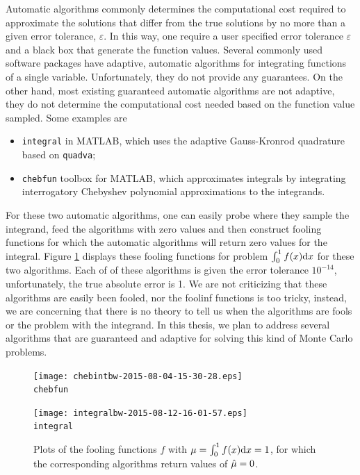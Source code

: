 \documentclass{iitthesis}
\theoremstyle{definition}
\begin{document}

Automatic algorithms commonly determines the computational cost required to approximate the solutions that differ from the true solutions by no more than a given error tolerance, $\varepsilon$. In this way, one require a user specified error tolerance $\varepsilon$ and a black box that generate the function values. Several commonly used software packages have adaptive, automatic algorithms for integrating functions of a single variable. Unfortunately, they do not provide any guarantees. On the other hand, most existing guaranteed automatic algorithms are not adaptive, they do not determine the computational cost needed based on the function value sampled. Some examples are
\begin{itemize}
\item {\tt integral} \cite{Shampone08} in MATLAB, which uses the adaptive Gauss-Kronrod quadrature based on {\tt quadva};
\item {\tt chebfun} toolbox \cite{Chebfun14} for MATLAB, which approximates integrals by integrating interrogatory Chebyshev polynomial approximations to the integrands.
\end{itemize}
For these two automatic algorithms, one can easily probe where they sample the integrand, feed the algorithms with zero values and then construct fooling functions for which the automatic algorithms will return zero values for the integral. Figure \ref{fig:foolingfun} displays these fooling functions for problem $\int_0^1f(x){\rm d} x$ for these two algorithms. Each of of these algorithms is given the error tolerance $10^{-14}$, unfortunately, the true absolute error is 1. We are not criticizing that these algorithms are easily been fooled, nor the foolinf functions is too tricky, instead, we are concerning that there is no theory to tell us when the algorithms are fools or the problem with the integrand.
In this thesis, we plan to address several algorithms that are guaranteed and adaptive for solving this kind of Monte Carlo problems.
\begin{figure}[htbp]
\centering
\begin{minipage}{7cm}\centering 
\texttt{[image: chebintbw-2015-08-04-15-30-28.eps]} \\ {\tt chebfun}  \end{minipage}%
\begin{minipage}{7cm}\centering 
\texttt{[image: integralbw-2015-08-12-16-01-57.eps]} \\{\tt integral}
\end{minipage}
\caption{Plots of the fooling functions $f$ with $\mu = \int_0^1f(x){\rm d} x=1$, for which the corresponding algorithms return values of $\hat{\mu}=0$.}\label{fig:foolingfun}
 \end{figure}
 
\end{document}
